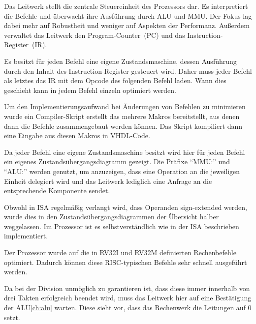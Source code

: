 
\label{ch:cu}

Das Leitwerk stellt die zentrale Steuereinheit des Prozessors dar. Es
interpretiert die Befehle und \"uberwacht ihre Ausf\"uhrung durch ALU und MMU.
Der Fokus lag dabei mehr auf Robustheit und weniger auf Aspekten der
Performanz. Au\ss{}erdem verwaltet das Leitwerk den Program-Counter~(PC) und
das Instruction-Register~(IR).

Es besitzt f\"ur jeden Befehl eine eigene Zustandsmaschine, dessen Ausf\"uhrung
durch den Inhalt des Instruction-Register gesteuert wird. Daher muss jeder
Befehl als letztes das IR mit dem Opcode des folgenden Befehl laden. Wann dies
geschieht kann in jedem Befehl einzeln optimiert werden.

Um den Implementierungsaufwand bei \"Anderungen von Befehlen zu minimieren
wurde ein Compiler-Skript erstellt das mehrere Makros bereitstellt, aus denen
dann die Befehle zusammengebaut werden k\"onnen. Das Skript kompiliert dann
eine Eingabe aus diesen Makros in VHDL-Code.

Da jeder Befehl eine eigene Zustandsmaschine besitzt wird hier f\"ur jeden
Befehl ein eigenes Zustands\-\"uber\-gangs\-dia\-gramm gezeigt. Die Pr\"afixe
``MMU:'' und ``ALU:'' werden genutzt, um anzuzeigen, dass eine Operation an die
jeweiligen Einheit delegiert wird und das Leitwerk lediglich eine Anfrage an
die entsprechende Komponente sendet.

Obwohl in ISA regelm\"a\ss{}ig verlangt wird, dass Operanden sign-extended
werden, wurde dies in den Zustands\-\"uber\-gangs\-dia\-grammen der \"Ubersicht
halber weggelassen. Im Prozessor ist es selbstverst\"andlich wie in der ISA
beschrieben implementiert.

Der Prozessor wurde auf die in RV32I und RV32M definierten Rechenbefehle
optimiert. Dadurch k\"onnen diese RISC-typischen Befehle sehr schnell
ausgef\"uhrt werden.


Da bei der Division unm\"oglich zu garantieren ist, dass diese immer innerhalb
von drei Takten erfolgreich beendet wird, muss das Leitwerk hier auf eine
Best\"atigung der ALU\ref{ch:alu} warten. Diese sieht vor, dass das Rechenwerk
die Leitungen  auf 0 setzt.

